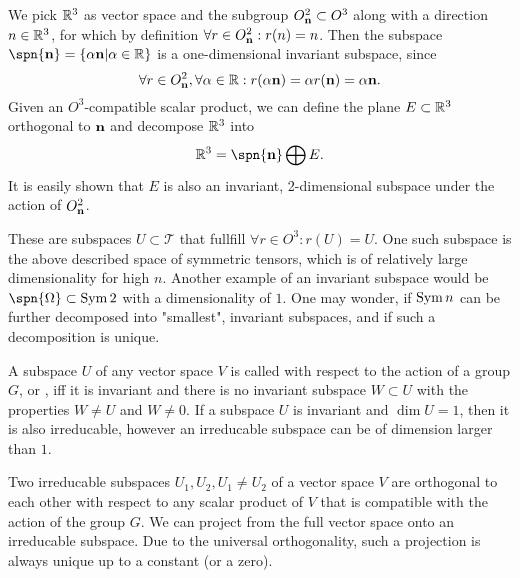 {\begin{example}
	We pick $\mathbb{R}^3$ as vector space and the subgroup $O^2_{\mathbf{n}} \subset O^3$ along with a direction $n\in\mathbb{R}^3$, for which by definition $\forall r \in O^2_{\mathbf{n}}: r(n)=n$.
	Then the subspace $\spn{\vc{n}}= \{\alpha \vc{n}|\alpha\in\IR\}$ is a one-dimensional invariant subspace, since 
	\[\forall r \in O^2_{\mathbf{n}}, \forall \alpha\in\mathbb{R}: r(\alpha \mathbf{n}) = \alpha r(\mathbf{n}) = \alpha\mathbf{n}.\]
	Given an $O^3$-compatible scalar product, we can define the plane $E\subset\mathbb{R}^3$ orthogonal to $\mathbf{n}$ and decompose $\mathbb{R}^3$ into \[\IR^3 = \spn{\vc{n}}\bigoplus E.\] It is easily shown that $E$ is also an invariant, 2-dimensional subspace under the action of $O^2_{\mathbf{n}}$.
	
\end{example}

\begin{example}
	These are subspaces $U\subset\mathcal{T}$ that fullfill $\forall r\in O^3: r(U)=U$. One such subspace is the above described space of symmetric tensors, which is of relatively large dimensionality for high $n$. Another example of an invariant subspace would be $\spn{\Omega}\subset\Sym{2}$ with a dimensionality of $1$.
	One may wonder, if $\operatorname{Sym}{n}$ can be further decomposed into "smallest", invariant subspaces, and if such a decomposition is unique.
\end{example}
\begin{definition} 
	A subspace $U$ of any vector space $V$ is called  with respect to the action of a group $G$, or , iff it is invariant and there is no invariant subspace $W\subset U$ with the properties $W\neq U$ and $W\neq 0$. If a subspace $U$ is invariant and $\dim U=1$, then it is also irreducable, however an irreducable subspace can be of dimension larger than $1$.
	
	Two irreducable subspaces $U_1, U_2, U_1 \neq U_2$ of a vector space $V$ are orthogonal to each other with respect to any scalar product of $V$ that is compatible with the action of the group $G$. We can project from the full vector space onto an irreducable subspace. Due to the universal orthogonality, such a projection is always unique up to a constant (or a zero).
	

\end{definition}}
